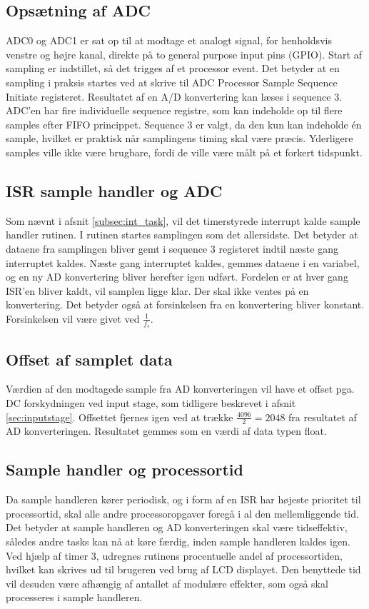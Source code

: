 \subsection{Opsætning af ADC}
ADC0 og ADC1 er sat op til at modtage et analogt signal, for henholdsvis venstre og højre kanal, direkte på to general purpose input pins (GPIO). 
Start af sampling er indstillet, så det trigges af et processor event. 
Det betyder at en sampling i praksis startes ved at skrive til ADC Processor Sample Sequence Initiate registeret. 
Resultatet af en A/D konvertering kan læses i sequence 3. 
ADC'en har fire individuelle sequence registre, som kan indeholde op til flere samples efter FIFO princippet. 
Sequence 3 er valgt, da den kun kan indeholde én sample, hvilket er praktisk når samplingens timing skal være præcis. 
Yderligere samples ville ikke være brugbare, fordi de ville være målt på et forkert tidspunkt. 

\subsection{ISR sample handler og ADC}
Som nævnt i afsnit \ref{subsec:int_task}, vil det timerstyrede interrupt kalde sample handler rutinen.
I rutinen startes samplingen som det allersidste. 
Det betyder at dataene fra samplingen bliver gemt i sequence 3 registeret indtil næste gang interruptet kaldes. 
Næste gang interruptet kaldes, gemmes dataene i en variabel, og en ny AD konvertering bliver herefter igen udført. 
Fordelen er at hver gang ISR'en bliver kaldt, vil samplen ligge klar.
Der skal ikke ventes på en konvertering. 
Det betyder også at forsinkelsen fra en konvertering bliver konstant. Forsinkelsen vil være givet ved $\frac{1}{f_s}$. 

\subsection{Offset af samplet data}
Værdien af den modtagede sample fra AD konverteringen vil have et offset pga. DC forskydningen ved input stage, som tidligere beskrevet i afsnit \ref{sec:inputstage}.
Offsettet fjernes igen ved at trække $\frac{4096}{2} = 2048$ fra resultatet af AD konverteringen. 
Resultatet gemmes som en værdi af data typen float. 

\subsection{Sample handler og processortid}
Da sample handleren kører periodisk, og i form af en ISR har højeste prioritet til processortid, skal alle andre processoropgaver foregå i al den mellemliggende tid. 
Det betyder at sample handleren og AD konverteringen skal være tidseffektiv, således andre tasks kan nå at køre færdig, inden sample handleren kaldes igen. 
Ved hjælp af timer 3, udregnes rutinens procentuelle andel af processortiden, hvilket kan skrives ud til brugeren ved brug af LCD displayet. 
Den benyttede tid vil desuden være afhængig af antallet af modulære effekter, som også skal processeres i sample handleren. 

